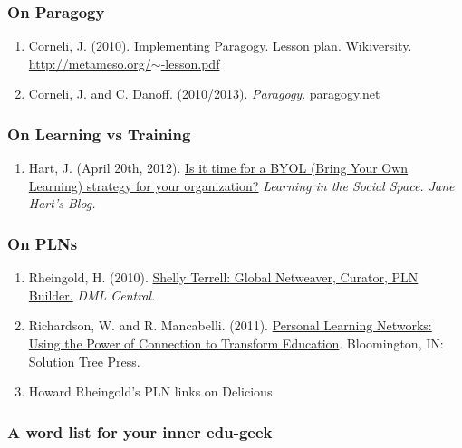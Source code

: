 \subsubsection{On Paragogy}

\begin{enumerate}
\item
  Corneli, J. (2010). Implementing Paragogy. Lesson plan. Wikiversity.
  \href{http://metameso.org/~joe/docs/paragogy-lesson.pdf}{http://metameso.org/\ensuremath{\sim}-lesson.pdf}
\item
  Corneli, J. and C. Danoff. (2010/2013). \emph{Paragogy}. paragogy.net
\end{enumerate}
\subsubsection{On Learning vs Training}

\begin{enumerate}
\item
  Hart, J. (April 20th, 2012). \href{http://www.c4lpt.co.uk/blog/2012/04/20/is-it-time-for-a-byol-bring-your-own-learning-strategy-in-your-organization-byol/}{Is it time for a BYOL (Bring Your Own
  Learning) strategy for your organization?} \emph{Learning in the Social
  Space. Jane Hart's Blog.}
\end{enumerate}
\subsubsection{On PLNs}

\begin{enumerate}
\item
  Rheingold, H. (2010).
  \href{http://dmlcentral.net/blog/howard-rheingold/shelly-terrell-global-netweaver-curator-pln-builder}{Shelly
  Terrell: Global Netweaver, Curator, PLN Builder.} \emph{DML
  Central}.
\item
  Richardson, W. and R. Mancabelli. (2011).
  \href{http://www.amazon.com/Personal-Learning-Networks-Connections-Transform/dp/193554327X}{Personal
  Learning Networks: Using the Power of Connection to Transform
  Education}. Bloomington, IN: Solution Tree Press.
\item
  Howard Rheingold's PLN links on Delicious
\end{enumerate}
\subsubsection{A word list for your inner edu-geek}

